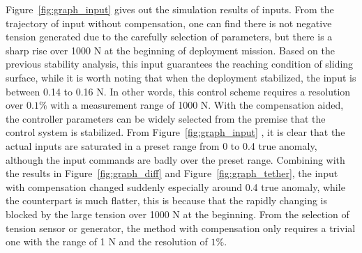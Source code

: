\documentclass[10pt,final,journal]{IEEEtran}
\begin{document}
Figure~\ref{fig:graph_input} gives out the simulation results of inputs.
From the trajectory of input without compensation, one can find there is not negative tension generated due to the carefully selection of parameters, but there is a sharp rise over 1000 N at the beginning of deployment mission. Based on the previous stability analysis, this input guarantees the reaching condition of sliding surface, while it is worth noting that when the deployment stabilized, the input is between 0.14 to 0.16 N. In other words, this control scheme requires a resolution over $0.1\%$ with a measurement range of 1000 N. 
With the compensation aided, the controller parameters can be widely selected from the premise that the control system is stabilized. From Figure~\ref{fig:graph_input} , it is clear that the actual inputs are saturated in a preset range from 0 to 0.4 true anomaly, although the input commands are badly over the preset range. 
Combining with the results in Figure~\ref{fig:graph_diff} and Figure~\ref{fig:graph_tether}, the input with compensation changed suddenly especially around 0.4 true anomaly, while the counterpart is much flatter, this is because that the rapidly changing is blocked by the large tension over 1000 N at the beginning.  
From the selection of tension sensor or generator, the method with compensation only requires a trivial one with the range of 1 N and the resolution of $1\%$. 
\end{document}
